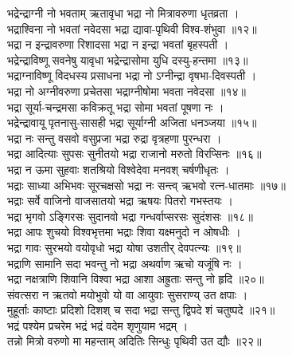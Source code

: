 \documentclass[12pt]{article}
\begin{document}
{{{भद्रेन्द्राग्नी नो भवताम् ऋतावृधा भद्रा नो मित्रावरुणा धृतव्रता ।\\
भद्राश्विना नो भवतां नवेदसा भद्रा द्यावा-पृथिवी विश्व-शंभुवा ॥१२॥\\

भद्रा न इन्द्रावरुणा रिशादसा भद्रा न इन्द्रा भवतां बृहस्पती ।\\
भद्रेन्द्राविष्णू सवनेषु यावृधा भद्रेन्द्रासोमा युधि दस्यु-हन्तमा ॥१३॥\\

भद्राग्नाविष्णू विदधस्य प्रसाधना भद्रा नो ऽग्नीन्द्रा वृषभा-दिवस्पती ।\\
भद्रा नो अग्नीवरुणा प्रचेतसा भद्राग्नीषोमा भवता नवेदसा ॥१४॥\\

भद्रा सूर्या-चन्द्रमसा कविक्रतू भद्रा सोमा भवतां पूषणा नः ।\\
भद्रेन्द्रावायू पृतनासु-सासही भद्रा सूर्याग्नी अजिता धनञ्जया ॥१५॥\\

भद्रा नः सन्तु वसवो वसुप्रजा भद्रा रुद्रा वृत्रहणा पुरन्धरा ।\\
भद्रा आदित्याः सुपसः सुनीतयो भद्रा राजानो मरुतो विरप्सिनः ॥१६॥\\

भद्रा न ऊमा सुहवाः शतश्रियो विश्वेदेवा मनवश् चर्षणीधृतः ।\\
भद्राः साध्या अभिभवः सूरचक्षसो भद्रा नः सन्त्व् ऋभवो रत्न-धातमाः ॥१७॥\\

भद्राः सर्वे वाजिनो वाजसातयो भद्रा ऋषयः पितरो गभस्तयः ।\\
भद्रा भृगवो ऽङ्गिरसः सुदानवो भद्रा गन्धर्वाप्सरसः सुदंशसः ॥१८॥\\

भद्रा आपः शुचयो विश्वभृत्तमा भद्राः शिवा यक्ष्मनुदो न ओषधीः ।\\
भद्रा गावः सुरभयो वयोवृधो भद्रा योषा उशतीर् देवपत्न्यः ॥१९॥\\

भद्राणि सामानि सदा भवन्तु नो भद्रा अथर्वाण ऋचो यजूंषि नः ।\\
भद्रा नक्षत्राणि शिवानि विश्वा भद्रा आशा अह्रुताः सन्तु नो हृदि ॥२०॥\\

संवत्सरा न ऋतवो मयोभुवो यो वा आयुवाः सुसराण्य् उत क्षपाः ।\\
मुहूर्ताः काष्टाः प्रदिशो दिशश् च सदा भद्रा सन्तु द्विपदे शं चतुष्पदे ॥२१॥\\

भद्रं पश्येम प्रचरेम भद्रं भद्रं वदेम शृणुयाम भद्रम् ।\\
तन्नो मित्रो वरुणो मा महन्ताम् अदितिः सिन्धुः पृथिवी उत द्यौः ॥२२॥\\
}}}\\
\end{document}

